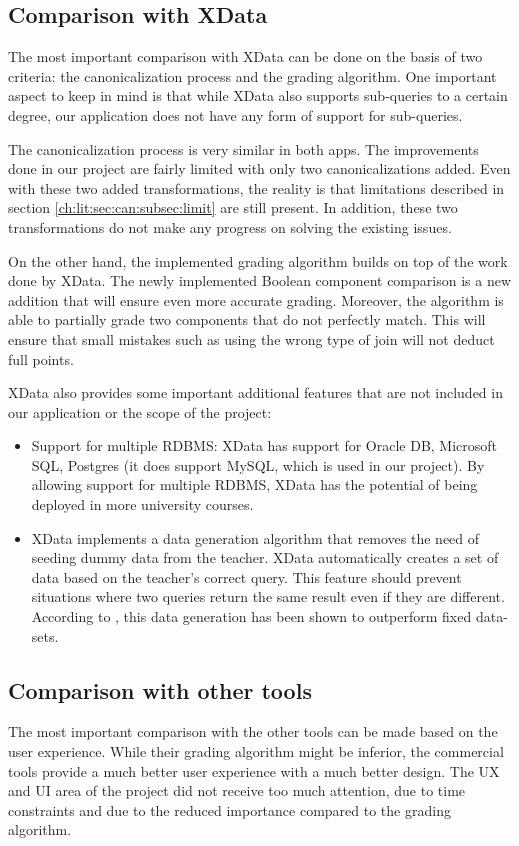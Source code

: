 \subsection{Comparison with XData}

The most important comparison with XData can be done on the basis of two criteria: the canonicalization process and the grading algorithm. One important aspect to keep in mind is that while XData also supports sub-queries to a certain degree, our application does not have any form of support for sub-queries.

The canonicalization process is very similar in both apps. The improvements done in our project are fairly limited with only two canonicalizations added. Even with these two added transformations, the reality is that limitations described in section \ref{ch:lit:sec:can:subsec:limit} are still present. In addition, these two transformations do not make any progress on solving the existing issues.

On the other hand, the implemented grading algorithm builds on top of the work done by XData. The newly implemented Boolean component comparison is a new addition that will ensure even more accurate grading. Moreover, the algorithm is able to partially grade two components that do not perfectly match. This will ensure that small mistakes such as using the wrong type of join will not deduct full points.

XData also provides some important additional features that are not included in our application or the scope of the project:
\begin{itemize}
    \item Support for multiple RDBMS: XData has support for Oracle DB, Microsoft SQL, Postgres (it does support MySQL, which is used in our project). By allowing support for multiple RDBMS, XData has the potential of being deployed in more university courses.
    \item XData implements a data generation algorithm that removes the need of seeding dummy data from the teacher. XData automatically creates a set of data based on the teacher's correct query. This feature should prevent situations where two queries return the same result even if they are different. According to \cite{lit:xdata_d}, this data generation has been shown to outperform fixed data-sets.
\end{itemize}

\subsection{Comparison with other tools}
The most important comparison with the other tools can be made based on the user experience. While their grading algorithm might be inferior, the commercial tools provide a much better user experience with a much better design. The UX and UI area of the project did not receive too much attention, due to time constraints and due to the reduced importance compared to the grading algorithm.

